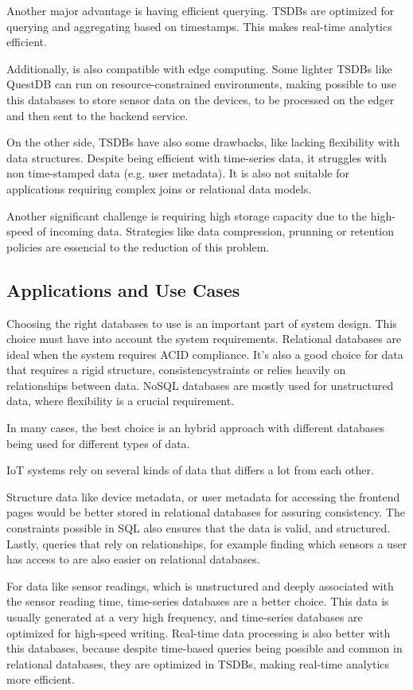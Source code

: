 Another major advantage is having efficient querying. \gls{TSDB}s are optimized
for querying and aggregating based on timestamps. This makes real-time analytics
efficient.

Additionally, is also compatible with edge computing.
Some lighter \gls{TSDB}s like QuestDB can run on resource-constrained environments,
making possible to use this databases to store sensor data on the devices,
to be processed on the edger and then sent to the backend service.


On the other side, \gls{TSDB}s have also some drawbacks, like lacking flexibility
with data structures.
Despite being efficient with time-series data, it struggles with non
time-stamped data (e.g. user metadata). It is also not suitable for applications requiring
complex joins or relational data models.

Another significant challenge is requiring high storage capacity due to the
high-speed of incoming data.
Strategies like data compression, prunning or retention policies
are essencial to the reduction of this problem.

\subsection{Applications and Use Cases}
Choosing the right databases to use is an important part of system design. This
choice must have into account the system requirements. Relational databases are
ideal when the system requires \gls{ACID} compliance. It's also a good choice for
data that requires a rigid structure, consistencystraints or relies heavily on
relationships between data. \gls{NoSQL} databases are mostly used for unstructured
data, where flexibility is a crucial requirement.

In many cases, the best choice is an hybrid approach with different databases
being used for different types of data.

\gls{IoT} systems rely on several kinds of data that differs a lot from each other.

Structure data like device metadata, or user metadata for accessing the
frontend pages would be better stored in relational databases for assuring
consistency. The constraints possible in \gls{SQL} also ensures that the data is valid,
and structured. Lastly, queries that rely on relationships, for example finding
which sensors a user has access to are also easier on relational databases.

For data like sensor readings, which is unstructured and deeply associated with
the sensor reading time, time-series databases are a better choice. This data
is usually generated at a very high frequency, and time-series databases are
optimized for high-speed writing. Real-time data processing is also better with
this databases, because despite time-based queries being possible and common in
relational databases, they are optimized in \gls{TSDB}s, making
real-time analytics more efficient.

